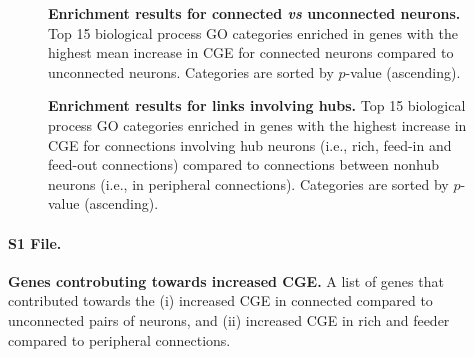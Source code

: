 \begin{figure}[h!]
   \caption{{\bf Enrichment results for connected \textit{vs} unconnected neurons.} Top 15 biological process GO categories enriched in genes with the highest mean increase in CGE for connected neurons compared to unconnected neurons.
Categories are sorted by $p$-value (ascending).}
\label{tab:enrichmentCON}
\end{figure}

\begin{figure}[h!]
   \caption{{\bf Enrichment results for links involving hubs.} Top 15 biological process GO categories enriched in genes with the highest increase in CGE for connections involving hub neurons (i.e., rich, feed-in and feed-out connections) compared to connections between nonhub neurons (i.e., in peripheral connections).
Categories are sorted by $p$-value (ascending).}
\label{tab:enrichmentRICH}
\end{figure}

\paragraph*{S1 File.}
\label{file:geneList}
{\bf Genes controbuting towards increased CGE.}
A list of genes that contributed towards the (i) increased CGE in connected compared to unconnected pairs of neurons, and (ii) increased CGE in rich and feeder compared to peripheral connections.
